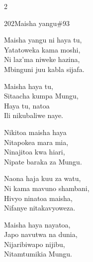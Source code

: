 \documentclass{article}
\begin{document}
\begin{multicols}{2}
\begin{hymn}{202}{Maisha yangu}{\#93}
\begin{stanza}
Maisha yangu ni haya tu,\\
Yatatoweka kama moshi,\\
Ni laz'ma niweke hazina,\\
Mbinguni juu kabla sijafa.
\end{stanza}
\begin{chorus}
Maisha haya tu,\\
Sitaacha kumpa Mungu,\\
Haya tu, natoa\\
Ili nikubaliwe naye.
\end{chorus}
\begin{stanza}
Nikitoa maisha haya\\
Nitapokea mara mia,\\
Ninajitoa kwa hiari,\\
Nipate baraka za Mungu.
\end{stanza}
\begin{stanza}
Naona haja kuu za watu,\\
Ni kama mavuno shambani,\\
Hivyo ninatoa maisha,\\
Nifanye nitakavyoweza.
\end{stanza}
\begin{stanza}
Maisha haya nayatoa,\\
Japo navutwa na dunia,\\
Nijaribiwapo nijibu,\\
Nitamtumikia Mungu.
\end{stanza}
\end{hymn}


\end{multicols}
\end{document}
